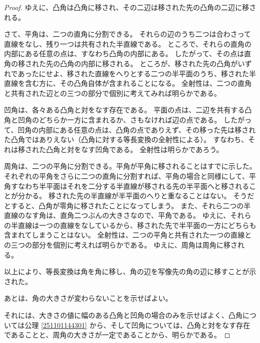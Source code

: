 \begin{proof}
  ゆえに、凸角は凸角に移され、その二辺は移された先の凸角の二辺に移される。

  さて、平角は、二つの直角に分割できる。
  それらの辺のうち二つは合わさって直線をなし、残り一つは共有された半直線である。
  ところで、それらの直角の内部にある任意の点は、すなわち凸角の内部にある。
  したがって、その点は直角の移された先の凸角の内部に移される。
  ところが、移された先の凸角がいずれであったにせよ、移された直線をへりとする二つの半平面のうち、移された半直線を含む方に、その凸角自体が含まれることになる。
  全射性は、二つの直角と共有された辺との三つの部分で個別に考えてみれば明らかである。

  凹角は、各々ある凸角と対をなす存在である。
  平面の点は、二辺を共有する凸角と凹角のどちらか一方に含まれるか、さもなければ辺の点である。
  したがって、凹角の内部にある任意の点は、凸角の点でありえず、その移った先は移された凸角ではありえない（凸角に対する等長変換の全射性による）。
  すなわち、それは移された凸角と対をなす凹角である。
  全射性は明らかであろう。

  周角は、二つの平角に分割できる。平角が平角に移されることはすでに示した。
  それぞれの平角をさらに二つの直角に分割すれば、平角の場合と同様にして、平角すなわち半平面はそれを二分する半直線が移される先の半平面へと移されることが分かる。
  移された先の半直線が半平面のへりと重なることはない。
  そうだとすると、凸角が零角に移されたことになってしまう。
  また、それら二つの半直線のなす角は、直角二つぶんの大きさなので、平角である。
  ゆえに、それらの半直線は一つの直線をなしているから、移された先で半平面の一方にどちらも含まれてしまうことはない。
  全射性は、二つの平角と共有された一つの直線との三つの部分を個別に考えれば明らかである。
  ゆえに、周角は周角に移される。

  以上により、等長変換は角を角に移し、角の辺を写像先の角の辺に移すことが示された。

  あとは、角の大きさが変わらないことを示せばよい。

  それには、大きさの値に幅のある凸角と凹角の場合のみを示せばよく、凸角については公理 \ref{251101144301} から、そして凹角については、凸角と対をなす存在であることと、周角の大きさが一定であることから、明らかである。
\end{proof}
